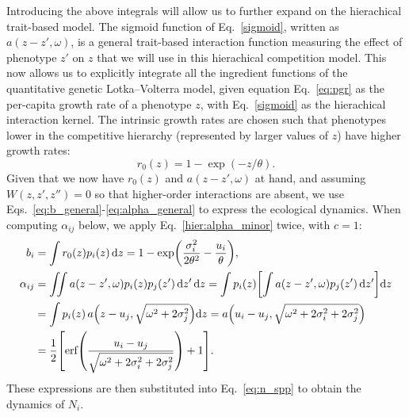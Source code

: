 \documentclass[10pt]{article}
\newcommand{\ud}{\text{d}}
\let\originalleft\left
\let\originalright\right
\renewcommand{\left}{\mathopen{}\mathclose\bgroup\originalleft}
\renewcommand{\right}{\aftergroup\egroup\originalright}
\begin{document}
Introducing the above integrals will allow us to further expand on the hierachical trait-based model. The sigmoid function of Eq.~\ref{sigmoid}, written as $a(z-z',\omega)$, is a general trait-based interaction function measuring the effect of phenotype $z'$ on $z$ that we will use in this hierachical competition model. This now allows us to explicitly integrate all the ingredient functions of the quantitative genetic Lotka--Volterra model, given equation Eq.~\ref{eq:pgr} as the per-capita growth rate of a phenotype $z$, with Eq.~\ref{sigmoid} as the hierachical interaction kernel. The intrinsic growth rates are chosen such that phenotypes lower in the competitive hierarchy (represented by larger values of $z$) have higher growth rates:
\begin{equation}
  \label{hier:r_0}
  r_0(z) = 1 - \exp(- z/\theta) .
\end{equation}
Given that we now have $r_0(z)$ and $a(z-z',\omega)$ at hand, and assuming $W(z,z',z'')=0$ so that higher-order interactions are absent, we use Eqs.~\ref{eq:b_general}-\ref{eq:alpha_general} to express the ecological dynamics. When computing $\alpha_{ij}$ below, we apply Eq.~\ref{hier:alpha_minor} twice, with $c = 1$:
\begin{align}
  \label{hier:avgg}
  b_i
  &= \int r_0(z) p_i(z) \,\ud z
  = 1 - \exp\left(\frac{\sigma_i^2}{2\theta^2}
  - \frac{u_i}{\theta} \right) ,
  \\
  \label{hier:alpha}
  \alpha_{ij}
  &= \iint a(z-z',\omega) p_i(z) p_j(z') \,\text{d} z' \,\text{d} z
  = \int p_i(z) \left[ \int a(z-z',\omega) p_j(z')
  \,\text{d} z' \right]  \text{d}z
  \\ \nonumber
  &= \int p_i(z) \,a\left(z-u_j,\sqrt{\omega^2+2\sigma_j^2}\right) \text{d}z
  = a\left(u_i-u_j,\sqrt{\omega^2+2\sigma_i^2+2\sigma_j^2}\right)
  \\ \nonumber
  &= \frac{1}{2} \left[ \text{erf} \left(
  \frac{u_i-u_j}{\sqrt{\omega^2+2\sigma_i^2+2\sigma_j^2}} \right) + 1\right] .
\end{align}
These expressions are then substituted into Eq.~\ref{eq:n_spp} to obtain the dynamics of $N_i$.
\end{document}
